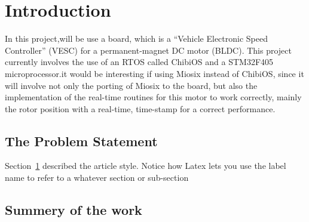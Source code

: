 \documentclass[11pt]{article}
\begin{document}
         
\section{Introduction}
\label{Introduction}

In this project,will be use a board, which is a “Vehicle Electronic Speed Controller” (VESC) for a permanent-magnet DC motor (BLDC). This project currently involves the use of an RTOS called ChibiOS and a STM32F405 microprocessor.it would be interesting if using  Miosix instead of ChibiOS, since it will involve not only the porting of Miosix to the board, but also the implementation of the real-time routines for this motor to work correctly, mainly the rotor position with a real-time, time-stamp for a correct performance.

\subsection{The Problem Statement}
\label{problem Statement}

Section~\ref{Introduction} described the article style.  Notice
how Latex lets you use the label name to refer to a whatever
section or sub-section 

\subsection{Summery of the work}
\label{Summery of the work}
\end{document}
